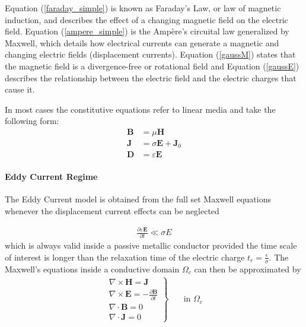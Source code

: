 \documentclass{article}
\newcommand{\mbf}[1]{\mathbf{#1}}
\begin{document}
Equation (\ref{faraday_simple}) is known as Faraday's Law, or law of
magnetic induction, and describes the effect of a changing magnetic
field on the electric field. Equation (\ref{ampere_simple}) is the
Ampère's circuital law generalized by Maxwell, which details how
electrical currents can generate a magnetic and changing electric fields
(displacement currents). Equation (\ref{gaussM}) states that the
magnetic field is a divergence-free or rotational field and Equation
(\ref{gaussE})  describes the relationship between the electric field
and the electric charges that cause it.

In most cases the constitutive equations refer to linear media and take
the following form:
\begin{subequations}
    \begin{align}
        \mathbf{B}&=\mu \mathbf{H} \\
        \mathbf{J}&=\sigma \mathbf{E}+\mathbf{J}_{0} \\
        \mathbf{D}&=\varepsilon \mathbf{E}
    \end{align}
\end{subequations}


\paragraph{Eddy Current Regime}
The Eddy Current model is obtained from the full set Maxwell equations
whenever the displacement current effects can be neglected

\begin{align}
    \frac{\partial \varepsilon \mathbf{E}}{\partial t} \ll \sigma E
\end{align}
which is always valid inside a passive metallic conductor provided the
time scale of interest is longer than the relaxation time of the
electric charge $t_r=\frac{\epsilon}{\sigma}$. The Maxwell's equations
inside a conductive domain $\Omega_c$ can then be approximated by
\begin{align}
    \left.
    \begin{array}{c}
        \nabla \times \mbf{H} = \mbf{J} \\
        \nabla \times \mbf{E} = -\frac{\partial \mbf{B}}{\partial t}\\
        \nabla \cdot \mbf{B}  = 0\\
        \nabla \cdot \mbf{J} = 0
    \end{array}
    \right\}
    \quad&\text{in } \Omega_c \label{eq:Maxwell:conductive}
\end{align}
\end{document}
